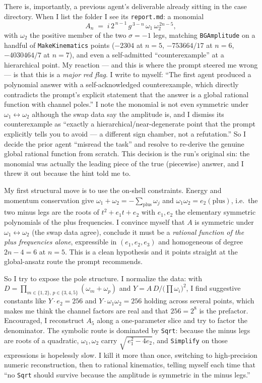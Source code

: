 \documentclass{article}
\begin{document}
There is, importantly, a previous agent's deliverable already sitting in the case
directory. When I list the folder I see its \texttt{report.md}: a monomial
\[
A_n \;=\; i\,2^{\,n-1}\,g^{\,3-n}\,\omega_1\,\omega_2^{\,2n-5},
\]
with $\omega_2$ the positive member of the two $\sigma=-1$ legs, matching
\texttt{BGAmplitude} on a handful of \texttt{MakeKinematics} points
($-2304$ at $n=5$, $-753664/17$ at $n=6$, $-4030464/7$ at $n=7$), and even a
self-admitted ``counterexample'' at a hierarchical point. My reaction --- and this
is where the prompt steered me wrong --- is that this is a \emph{major red flag}.
I write to myself: ``The first agent produced a polynomial answer with a
self-acknowledged counterexample, which directly contradicts the prompt's explicit
statement that the answer is a global rational function with channel poles.'' I
note the monomial is not even symmetric under $\omega_1\leftrightarrow\omega_2$
although the swap data say the amplitude is, and I dismiss its counterexample as
``exactly a hierarchical/near-degenerate point that the prompt explicitly tells
you to avoid --- a different sign chamber, not a refutation.'' So I decide the
prior agent ``misread the task'' and resolve to re-derive the genuine global
rational function from scratch. This decision is the run's original sin: the
monomial was actually the leading piece of the true (piecewise) answer, and I
threw it out because the hint told me to.

My first structural move is to use the on-shell constraints. Energy and momentum
conservation give $\omega_1+\omega_2=-\sum_{\text{plus}}\omega_j$ and
$\omega_1\omega_2=e_2(\text{plus})$, i.e.\ the two minus legs are the roots of
$t^2+e_1 t+e_2$ with $e_1,e_2$ the elementary symmetric polynomials of the plus
frequencies. I convince myself that $A$ is symmetric under
$\omega_1\leftrightarrow\omega_2$ (the swap data agree), conclude it must be a
\emph{rational function of the plus frequencies alone}, expressible in
$(e_1,e_2,e_3)$ and homogeneous of degree $2n-4=6$ at $n=5$. This is a clean
hypothesis and it points straight at the global-ansatz route the prompt
recommends.

So I try to expose the pole structure. I normalize the data: with
$D=\prod_{m\in\{1,2\},\,p\in\{3,4,5\}}(\omega_m+\omega_p)$ and
$Y=A\,D/\big(\prod\omega_i\big)^2$, I find suggestive constants like
$Y\cdot e_2=256$ and $Y\cdot\omega_1\omega_2=256$ holding across several points,
which makes me think the channel factors are real and that $256=2^{8}$ is the
prefactor. Encouraged, I reconstruct $A_5$ along a one-parameter slice and try to
factor the denominator. The symbolic route is dominated by \texttt{Sqrt}: because
the minus legs are roots of a quadratic, $\omega_1,\omega_2$ carry
$\sqrt{\,e_1^2-4e_2}$, and \texttt{Simplify} on those expressions is hopelessly
slow. I kill it more than once, switching to high-precision numeric
reconstruction, then to rational kinematics, telling myself each time that ``no
\texttt{Sqrt} should survive because the amplitude is symmetric in the minus
legs.''
\end{document}
